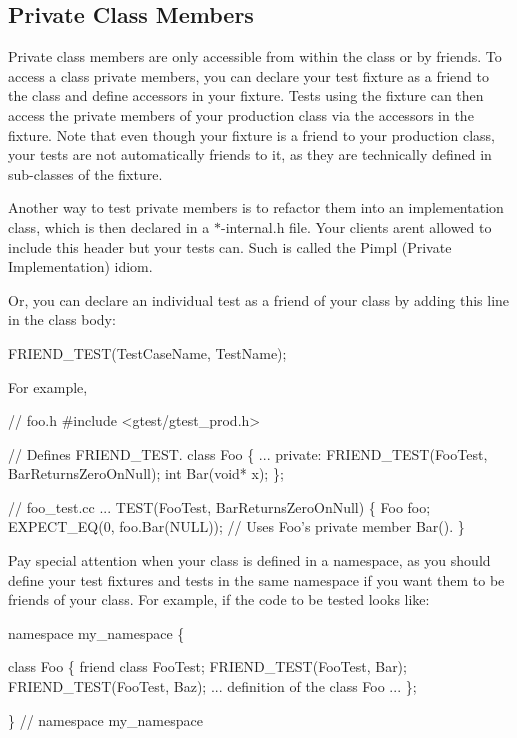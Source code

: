 \subsection*{Private Class Members}

Private class members are only accessible from within the class or by friends. To access a class\textquotesingle{} private members, you can declare your test fixture as a friend to the class and define accessors in your fixture. Tests using the fixture can then access the private members of your production class via the accessors in the fixture. Note that even though your fixture is a friend to your production class, your tests are not automatically friends to it, as they are technically defined in sub-\/classes of the fixture.

Another way to test private members is to refactor them into an implementation class, which is then declared in a {\ttfamily $\ast$-\/internal.h} file. Your clients aren\textquotesingle{}t allowed to include this header but your tests can. Such is called the Pimpl (Private Implementation) idiom.

Or, you can declare an individual test as a friend of your class by adding this line in the class body\+:


\begin{DoxyCode}
FRIEND\_TEST(TestCaseName, TestName);
\end{DoxyCode}


For example, 
\begin{DoxyCode}
// foo.h
#include <gtest/gtest\_prod.h>

// Defines FRIEND\_TEST.
class Foo \{
  ...
 private:
  FRIEND\_TEST(FooTest, BarReturnsZeroOnNull);
  int Bar(void* x);
\};

// foo\_test.cc
...
TEST(FooTest, BarReturnsZeroOnNull) \{
  Foo foo;
  EXPECT\_EQ(0, foo.Bar(NULL));
  // Uses Foo's private member Bar().
\}
\end{DoxyCode}


Pay special attention when your class is defined in a namespace, as you should define your test fixtures and tests in the same namespace if you want them to be friends of your class. For example, if the code to be tested looks like\+:


\begin{DoxyCode}
namespace my\_namespace \{

class Foo \{
  friend class FooTest;
  FRIEND\_TEST(FooTest, Bar);
  FRIEND\_TEST(FooTest, Baz);
  ...
  definition of the class Foo
  ...
\};

\}  // namespace my\_namespace
\end{DoxyCode}


